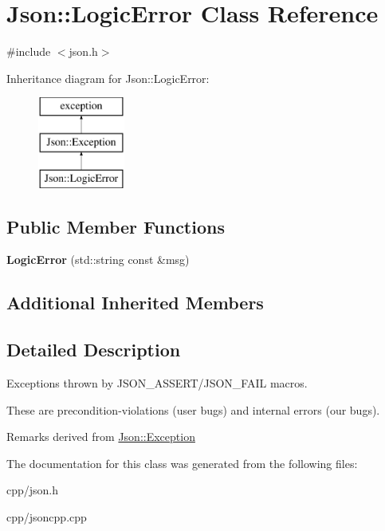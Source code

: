 \hypertarget{class_json_1_1_logic_error}{}\section{Json\+:\+:Logic\+Error Class Reference}
\label{class_json_1_1_logic_error}


{\ttfamily \#include $<$json.\+h$>$}

Inheritance diagram for Json\+:\+:Logic\+Error\+:\begin{figure}[H]
\begin{center}
\leavevmode
\includegraphics[height=3.000000cm]{class_json_1_1_logic_error}
\end{center}
\end{figure}
\subsection*{Public Member Functions}
\begin{DoxyCompactItemize}
\item 
\mbox{\label{class_json_1_1_logic_error_ae8a834c790017a55df74c70b91f23329}} 
{\bfseries Logic\+Error} (std\+::string const \&msg)
\end{DoxyCompactItemize}
\subsection*{Additional Inherited Members}


\subsection{Detailed Description}
Exceptions thrown by J\+S\+O\+N\+\_\+\+A\+S\+S\+E\+R\+T/\+J\+S\+O\+N\+\_\+\+F\+A\+IL macros.

These are precondition-\/violations (user bugs) and internal errors (our bugs).

\begin{DoxyRemark}{Remarks}
derived from \hyperlink{class_json_1_1_exception}{Json\+::\+Exception} 
\end{DoxyRemark}


The documentation for this class was generated from the following files\+:\begin{DoxyCompactItemize}
\item 
cpp/json.\+h\item 
cpp/jsoncpp.\+cpp\end{DoxyCompactItemize}
